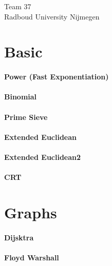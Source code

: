 \documentclass[a4paper]{article}
\begin{document}
\null\vfill
\begin{center}
{\huge Team 37}\\
\vspace{10cm}
{\large Radboud University Nijmegen}
\end{center}
\vfill
\thispagestyle{empty} %
\newpage

\clearpage
\setcounter{page}{1}

\tableofcontents
\newpage

\section{Basic} 
\paragraph{Power (Fast Exponentiation)} \hfill

\paragraph{Binomial} \hfill

\paragraph{Prime Sieve} \hfill

\paragraph{Extended Euclidean} \hfill

\paragraph{Extended Euclidean2} \hfill

\paragraph{CRT} \hfill

\section{Graphs}
\paragraph{Dijsktra} \hfill

\paragraph{Floyd Warshall} \hfill

\end{document}

